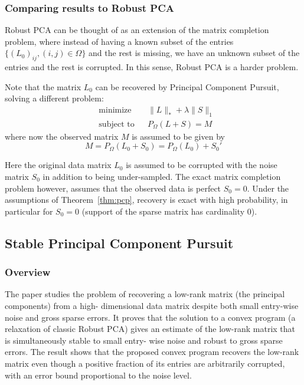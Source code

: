 \documentclass{../../common/projectreport}
\begin{document}
\subsubsection{Comparing results to Robust PCA}
Robust PCA can be thought of as an extension of the matrix completion problem, where instead of having a known subset of the entries $\{(L_0)_{ij}, (i,j)\in \Omega\}$ and the rest is missing, we have an unknown subset of the entries and the rest is corrupted. In this sense, Robust PCA is a harder problem.

Note that the matrix $L_0$ can be recovered by Principal Component Pursuit, solving a different problem:
\begin{equation}
\begin{aligned}
&\text{minimize} && \|L\|_* + \lambda \|S\|_1\\
&\text{subject to} && P_\Omega (L+S) = M
\end{aligned}
\end{equation}
where now the observed matrix $M$ is assumed to be given by
\[
M = P_\Omega (L_0 + S_0) = P_\Omega (L_0) + S_0'
\]

Here the original data matrix $L_0$ is assumed to be corrupted with the noise matrix $S_0$ in addition to being under-sampled. The exact matrix completion problem however, assumes that the observed data is perfect $S_0 = 0$. Under the assumptions of Theorem~\ref{thm:pcp}, recovery is exact with high probability, in particular for $S_0 = 0$ (support of the sparse matrix has cardinality $0$).




\subsection{Stable Principal Component Pursuit}
\subsubsection{Overview}

The paper studies the problem of recovering a low-rank matrix (the principal components) from a high- dimensional data matrix despite both small entry-wise noise and gross sparse errors. It proves that the solution to a convex program (a relaxation of classic Robust PCA) gives an estimate of the low-rank matrix that is simultaneously stable to small entry- wise noise and robust to gross sparse errors. The result shows that the proposed convex program recovers the low-rank matrix even though a positive fraction of its entries are arbitrarily corrupted, with an error bound proportional to the noise level.
\end{document}
